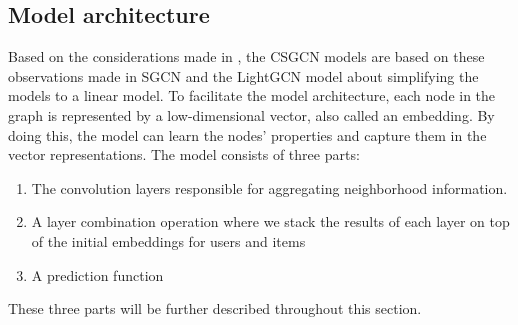 \subsection{Model architecture}\label{subsec:csgcn_is_model_architecture}
Based on the considerations made in , the CSGCN models are based on these observations made in SGCN \cite{SimplifyingGCN} and the LightGCN model \cite{LightGCN} about simplifying the models to a linear model.
To facilitate the model architecture, each node in the graph is represented by a low-dimensional vector, also called an embedding.
By doing this, the model can learn the nodes' properties and capture them in the vector representations.
The model consists of three parts:
\begin{enumerate}
    \item The convolution layers responsible for aggregating neighborhood information.
    \item A layer combination operation where we stack the results of each layer on top of the initial embeddings for users and items
    \item A prediction function
\end{enumerate}
These three parts will be further described throughout this section.


